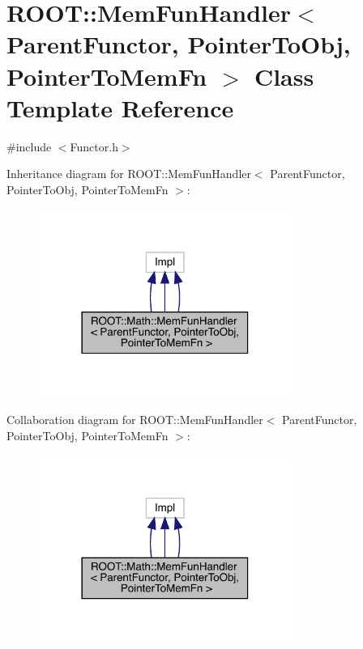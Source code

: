 \hypertarget{classROOT_1_1Math_1_1MemFunHandler}{}\section{R\+O\+OT\+:\+:Mem\+Fun\+Handler$<$ Parent\+Functor, Pointer\+To\+Obj, Pointer\+To\+Mem\+Fn $>$ Class Template Reference}
\label{classROOT_1_1Math_1_1MemFunHandler}


{\ttfamily \#include $<$Functor.\+h$>$}



Inheritance diagram for R\+O\+OT\+:\+:Mem\+Fun\+Handler$<$ Parent\+Functor, Pointer\+To\+Obj, Pointer\+To\+Mem\+Fn $>$\+:
\nopagebreak
\begin{figure}[H]
\begin{center}
\leavevmode
\includegraphics[width=234pt]{d3/d37/classROOT_1_1Math_1_1MemFunHandler__inherit__graph}
\end{center}
\end{figure}


Collaboration diagram for R\+O\+OT\+:\+:Mem\+Fun\+Handler$<$ Parent\+Functor, Pointer\+To\+Obj, Pointer\+To\+Mem\+Fn $>$\+:
\nopagebreak
\begin{figure}[H]
\begin{center}
\leavevmode
\includegraphics[width=234pt]{df/dd0/classROOT_1_1Math_1_1MemFunHandler__coll__graph}
\end{center}
\end{figure}
